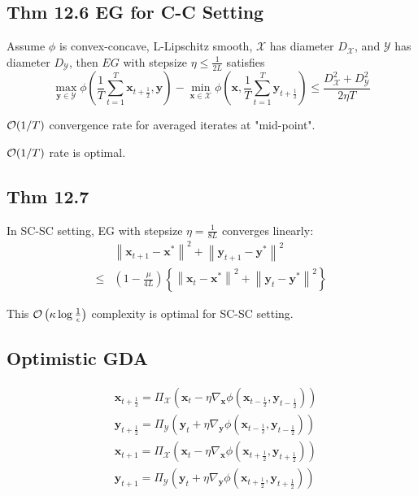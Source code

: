 \subsection*{Thm 12.6 EG for C-C Setting}
Assume $\phi$ is convex-concave, L-Lipschitz smooth, $\mathcal{X}$ has diameter $D_{\mathcal{X}}$, and $\mathcal{Y}$ has diameter $D_{\mathcal{Y}}$, then $E G$ with stepsize $\eta \leq \frac{1}{2 L}$ satisfies
$$
\max _{\mathbf{y} \in \mathcal{Y}} \phi\left(\frac{1}{T} \sum_{t=1}^{T} \mathbf{x}_{t+\frac{1}{2}}, \mathbf{y}\right)-\min _{\mathbf{x} \in \mathcal{X}} \phi\left(\mathbf{x}, \frac{1}{T} \sum_{t=1}^{T} \mathbf{y}_{t+\frac{1}{2}}\right) \leq \frac{D_{\mathcal{X}}^{2}+D_{\mathcal{Y}}^{2}}{2 \eta T}
$$

$\operatorname{\mathcal{O}}(1 / T)$ convergence rate for averaged iterates at "mid-point".

$\operatorname{\mathcal{O}}(1 / T)$ rate is optimal.





\subsection*{Thm 12.7}
In SC-SC setting, EG with stepsize $\eta=\frac{1}{8 L}$ converges linearly:
$$
\begin{aligned}
&\left\|\mathbf{x}_{t+1}-\mathbf{x}^{*}\right\|^{2}+\left\|\mathbf{y}_{t+1}-\mathbf{y}^{*}\right\|^{2}\\
\leq& \left(1-\frac{\mu}{4 L}\right)\left\{\left\|\mathbf{x}_{t}-\mathbf{x}^{*}\right\|^{2}+\left\|\mathbf{y}_{t}-\mathbf{y}^{*}\right\|^{2}\right\}
\end{aligned}
$$

This $\operatorname{\mathcal{O}}\left(\kappa \log \frac{1}{\epsilon}\right)$ complexity is optimal for SC-SC setting.





\subsection*{Optimistic GDA}
$$
\begin{aligned}
&\mathbf{x}_{t+\frac{1}{2}}=\Pi_{\mathcal{X}}\left(\mathbf{x}_{t}-\eta \nabla_{\mathbf{x}} \phi\left(\mathbf{x}_{t-\frac{1}{2}}, \mathbf{y}_{t-\frac{1}{2}}\right)\right) \\ &\mathbf{y}_{t+\frac{1}{2}}=\Pi_{\mathcal{Y}}\left(\mathbf{y}_{t}+\eta \nabla_{\mathbf{y}} \phi\left(\mathbf{x}_{t-\frac{1}{2}}, \mathbf{y}_{t-\frac{1}{2}}\right)\right) \\
&\mathbf{x}_{t+1}=\Pi_{\mathcal{X}}\left(\mathbf{x}_{t}-\eta \nabla_{\mathbf{x}} \phi\left(\mathbf{x}_{t+\frac{1}{2}}, \mathbf{y}_{t+\frac{1}{2}}\right)\right) \\ &\mathbf{y}_{t+1}=\Pi_{\mathcal{Y}}\left(\mathbf{y}_{t}+\eta \nabla_{\mathbf{y}} \phi\left(\mathbf{x}_{t+\frac{1}{2}}, \mathbf{y}_{t+\frac{1}{2}}\right)\right)
\end{aligned}
$$



